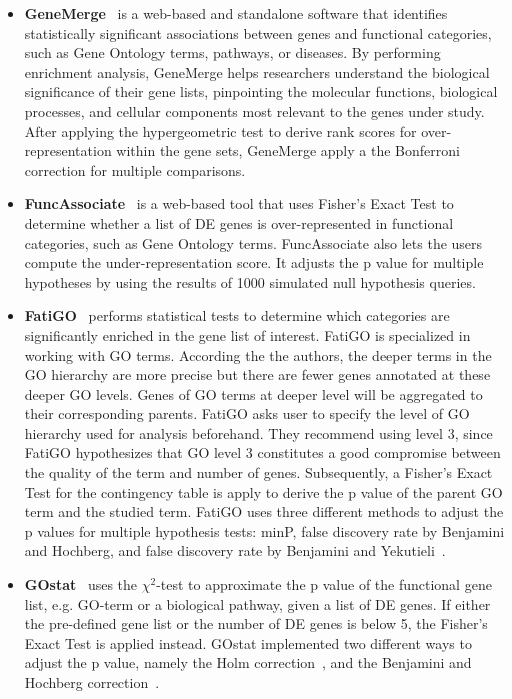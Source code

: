 \begin{itemize}
\item \textbf{GeneMerge}~\cite{Castillo-Davis:2002} is a web-based and standalone software that identifies statistically significant associations between genes and functional categories, such as Gene Ontology terms, pathways, or diseases. By performing enrichment analysis, GeneMerge helps researchers understand the biological significance of their gene lists, pinpointing the molecular functions, biological processes, and cellular components most relevant to the genes under study. After applying the hypergeometric test to derive rank scores for over-representation within the gene sets, GeneMerge apply a the Bonferroni correction for multiple comparisons.

\item \textbf{FuncAssociate}~\cite{Berriz:2003} is a web-based tool that uses Fisher's Exact Test to determine whether a list of DE genes is over-represented in functional categories, such as Gene Ontology terms. FuncAssociate also lets the users compute the under-representation score. It adjusts the p value for multiple hypotheses by using the results of 1000 simulated null hypothesis queries.

\item \textbf{FatiGO}~\cite{Al-Shahrour:2004} performs statistical tests to determine which categories are significantly enriched in the gene list of interest. FatiGO is specialized in working with GO terms. According the the authors, the deeper terms in the GO hierarchy are more precise but there are fewer genes annotated at these deeper GO levels. Genes of GO terms at deeper level will be aggregated to their corresponding parents. FatiGO asks user to specify the level of GO hierarchy used for analysis beforehand. They recommend using level 3, since FatiGO hypothesizes that GO level 3 constitutes a good compromise between the quality of the term and number of genes. Subsequently, a Fisher's Exact Test for the contingency table is apply to derive the p value of the parent GO term and the studied term. FatiGO uses three different methods to adjust the p values for multiple hypothesis tests: minP\cite{Westfall:1993}, false discovery rate by Benjamini and Hochberg\cite{Benjamini:1995}, and false discovery rate by Benjamini and Yekutieli~\cite{Benjamini:2001}.

\item \textbf{GOstat}~\cite{Beissbarth:2004} uses the $\chi^2$-test to approximate the p value of the functional gene list, e.g. GO-term or a biological pathway, given a list of DE genes. If either the pre-defined gene list or the number of DE genes is below 5, the Fisher's Exact Test is applied instead. GOstat implemented two different ways to adjust the p value, namely the Holm correction~\cite{Holm:1979}, and the Benjamini and Hochberg correction~\cite{Benjamini:1995}.


\end{itemize}
